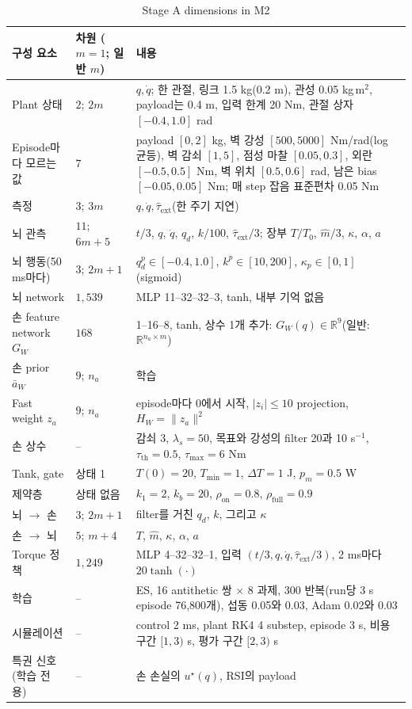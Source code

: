 \documentclass[11pt]{article}\usepackage[margin=1in]{geometry}\usepackage{amsmath,amssymb,amsthm,mathtools}\usepackage{graphicx}\graphicspath{{figures/}{../figures/}{figs/}{./}}\usepackage{enumitem}\usepackage{hyperref}\usepackage{cleveref}\usepackage{tikz}\usetikzlibrary{arrows.meta,positioning,calc,shapes.geometric}\usepackage{float}\usepackage{rotating}\usepackage[most]{tcolorbox}\usepackage{kotex}\usepackage{booktabs}\usepackage{longtable}\emergencystretch=1.6em\tolerance=2000 \crefname{assumption}{Assumption}{Assumptions}\Crefname{assumption}{Assumption}{Assumptions}\crefname{definition}{Definition}{Definitions}\Crefname{definition}{Definition}{Definitions}\crefname{proposition}{Proposition}{Propositions}\Crefname{proposition}{Proposition}{Propositions}\crefname{fact}{Fact}{Facts}\Crefname{fact}{Fact}{Facts} \newtheorem{assumption}{Assumption}\newtheorem{definition}{Definition}\newtheorem{lemma}{Lemma}\newtheorem{proposition}{Proposition}\newtheorem{theorem}{Theorem}\newtheorem{corollary}{Corollary}\newtheorem{fact}{Fact}\theoremstyle{remark}\newtheorem{remark}{Remark} \newcommand{\R}{\mathbb{R}}\newcommand{\xb}{\bar x}\newcommand{\Ab}{\bar A}\newcommand{\By}{\bar B_y}\newcommand{\U}{\mathcal U}\newcommand{\Z}{\mathcal Z}
\begin{document}
\begin{table}[H]
\centering\footnotesize
\caption{Stage A dimensions in M2}
\label{tab:m2dims}
\begin{tabular}{p{3.3cm}p{2.3cm}p{9.2cm}}
\toprule
구성 요소 & 차원 ($m=1$; 일반 $m$) & 내용 \\
\midrule
Plant 상태 & $2$; $2m$ & $q,\dot q$; 한 관절, 링크 1.5 kg(0.2 m), 관성 0.05 kg\,m$^2$, payload는 0.4 m, 입력 한계 20 Nm, 관절 상자 $[-0.4,1.0]$ rad \\
Episode마다 모르는 값 & $7$ & payload $[0,2]$ kg, 벽 강성 $[500,5000]$ Nm/rad(log 균등), 벽 감쇠 $[1,5]$, 점성 마찰 $[0.05,0.3]$, 외란 $[-0.5,0.5]$ Nm, 벽 위치 $[0.5,0.6]$ rad, 남은 bias $[-0.05,0.05]$ Nm; 매 step 잡음 표준편차 0.05 Nm \\
측정 & $3$; $3m$ & $q,\dot q,\hat\tau_{\mathrm{ext}}$(한 주기 지연) \\
뇌 관측 & $11$; $6m+5$ & $t/3$, $q$, $\dot q$, $q_d$, $k/100$, $\hat\tau_{\mathrm{ext}}/3$; 장부 $T/T_0$, $\hat m/3$, $\kappa$, $\alpha$, $a$ \\
뇌 행동(50 ms마다) & $3$; $2m+1$ & $q_d^p\in[-0.4,1.0]$, $k^p\in[10,200]$, $\kappa_p\in[0,1]$(sigmoid) \\
뇌 network & $1{,}539$ & MLP 11--32--32--3, tanh, 내부 기억 없음 \\
손 feature network $G_W$ & $168$ & 1--16--8, tanh, 상수 1개 추가: $G_W(q)\in\R^{9}$(일반: $\R^{n_a\times m}$) \\
손 prior $\bar a_W$ & $9$; $n_a$ & 학습 \\
Fast weight $z_a$ & $9$; $n_a$ & episode마다 0에서 시작, $|z_i|\le10$ projection, $H_W=\|z_a\|^2$ \\
손 상수 & -- & 감쇠 3, $\lambda_s=50$, 목표와 강성의 filter 20과 10 s$^{-1}$, $\tau_{\mathrm{th}}=0.5$, $\tau_{\max}=6$ Nm \\
Tank, gate & 상태 1 & $T(0)=20$, $T_{\min}=1$, $\Delta T=1$ J, $p_m=0.5$ W \\
제약층 & 상태 없음 & $k_1=2$, $k_b=20$, $\rho_{\mathrm{on}}=0.8$, $\rho_{\mathrm{full}}=0.9$ \\
뇌 $\rightarrow$ 손 & $3$; $2m+1$ & filter를 거친 $q_d$, $k$, 그리고 $\kappa$ \\
손 $\rightarrow$ 뇌 & $5$; $m+4$ & $T$, $\hat m$, $\kappa$, $\alpha$, $a$ \\
Torque 정책 & $1{,}249$ & MLP 4--32--32--1, 입력 $(t/3,q,\dot q,\hat\tau_{\mathrm{ext}}/3)$, 2 ms마다 $20\tanh(\cdot)$ \\
학습 & -- & ES, 16 antithetic 쌍 $\times$ 8 과제, 300 반복(run당 3 s episode 76{,}800개), 섭동 0.05와 0.03, Adam 0.02와 0.03 \\
시뮬레이션 & -- & control 2 ms, plant RK4 4 substep, episode 3 s, 비용 구간 $[1,3)$ s, 평가 구간 $[2,3)$ s \\
특권 신호(학습 전용) & -- & 손 손실의 $u^\star(q)$, RSI의 payload \\
\bottomrule
\end{tabular}
\end{table}
\end{document}
